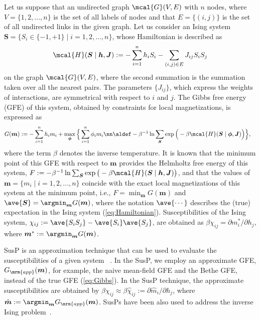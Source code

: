 \documentclass[%
 reprint,
 amsmath,amssymb,
 aps, 
 pre,
 showkeys
]{revtex4-1}
\begin{document}
Let us suppose that an undirected graph $\mcal{G}(V,E)$ with $n$ nodes, where $V = \{1,2,\ldots, n\}$ is the set of all labels of nodes and that $E=\{(i,j)\}$ is the set of all undirected links in the given graph.   
Let us consider an Ising system $\bm{S}=\{S_i \in \{-1,+1\}\mid i = 1,2,\ldots, n\}$, whose Hamiltonian is described as
\begin{align}
\mcal{H}(\bm{S}\mid \bm{h}, \bm{J}):=-\sum_{i=1}^n h_i S_i - \sum_{(i,j) \in E}J_{ij}S_i S_j
\label{eq:Hamiltonian}
\end{align}
on the graph $\mcal{G}(V,E)$, 
where the second summation is the summation taken over all the nearest pairs. 
The parameters $\{J_{ij}\}$, which express the weights of interactions, are symmetrical with respect to $i$ and $j$.
The Gibbs free energy (GFE) of this system, obtained by constraints for local magnetizations, is expressed as~\cite{Yasuda&Tanaka2009}
\begin{align}
G(\bm{m})&:= -  \sum_{i=1}^n h_i m_i + \max_{\bm{\phi}}\Big\{\sum_{i=1}^n \phi_i m_i \nn
\aldef
- \beta^{-1}\ln \sum_{\bm{S}} \exp \Big( - \beta \mcal{H}(\bm{S}\mid \bm{\phi}, \bm{J})\Big)\Big\},
\label{eq:Gibbs}
\end{align} 
where the term $\beta$ denotes the inverse temperature. 
It is known that the minimum point of this GFE with respect to $\bm{m}$ provides the Helmholtz free energy 
of this system, $ F:= - \beta^{-1}\ln \sum_{\bm{S}}\exp  \big(-\beta \mcal{H}(\bm{S}\mid \bm{h}, \bm{J})\big)$, and that the values of 
$\bm{m}=\{m_i \mid i = 1,2,\ldots,n\}$ coincide with the exact local magnetizations of this system at the minimum point, i.e., 
$F = \min_{\bm{m}}G(\bm{m})$ and $\ave{\bm{S}} = \argmin_{\bm{m}}G(\bm{m})$, where the notation $\ave{\cdots}$ describes the (true) expectation in the Ising system (\ref{eq:Hamiltonian}).
Susceptibilities of the Ising system, $\chi_{ij}:= \ave{S_iS_j} - \ave{S_i}\ave{S_j}$, are obtained as 
$ \beta \chi_{ij} = \partial m_i^* /\partial h_j$, where $\bm{m}^*:= \argmin_{\bm{m}} G(\bm{m})$.

SusP is an approximation technique that can be used to evaluate the susceptibilities of a given system
~\cite{K.Tanaka2003, Welling&Teh2003, Welling&Teh2004, Mezard&Mora2009}. 
In the SusP, we employ an approximate GFE, $G_{\mrm{app}}(\bm{m})$, for example, the naive mean-field GFE and the Bethe GFE, instead of the true GFE (\ref{eq:Gibbs}).  
In the SusP technique, the approximate susceptibilities are obtained by $\beta \chi_{ij} \approx \beta \hat{\chi}_{ij}:=\partial \hat{m}_i /\partial h_j$, 
where $\hat{\bm{m}}:= \argmin_{\bm{m}} G_{\mrm{app}}(\bm{m})$. 
SusPs have been also used to address the inverse Ising problem~\cite{Yasuda&Tanaka2009, Marinari&Kerrebroeck2010}. 
\end{document}
